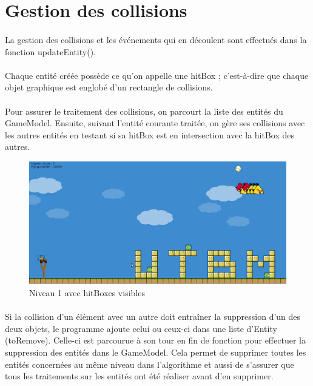 \documentclass[a4paper,12pt]{report}
\begin{document}
\section{Gestion des collisions}

\paragraph{}La gestion des collisions et les événements qui en découlent sont effectués dans la fonction updateEntity().

\paragraph{}Chaque entité créée possède ce qu'on appelle une hitBox ; c'est-à-dire que chaque objet graphique est englobé d'un rectangle de collisions. 

\paragraph{}Pour assurer le traitement des collisions, on parcourt la liste des entités du GameModel. Ensuite, suivant l'entité courante traitée, on gère ses collisions avec les autres entités en testant si sa hitBox est en intersection avec la hitBox des autres.

\begin{figure}[H]
\begin{center}
\includegraphics[scale=0.35]{images/lvl01hitbox.png} 
\end{center}
\caption{Niveau 1 avec hitBoxes visibles}
\label{Niveau 1 avec hitBoxes visibles}
\end{figure}

\paragraph{}Si la collision d'un élément avec un autre doit entraîner la suppression d'un des deux objets, le programme ajoute celui ou ceux-ci dans une liste d'Entity (toRemove). Celle-ci est parcourue à son tour en fin de fonction pour effectuer la suppression des entités dans le GameModel. Cela permet de supprimer toutes les entités concernées au même niveau dans l'algorithme et aussi de s'assurer que tous les traitements sur les entités ont été réaliser avant d'en supprimer.
\end{document}
